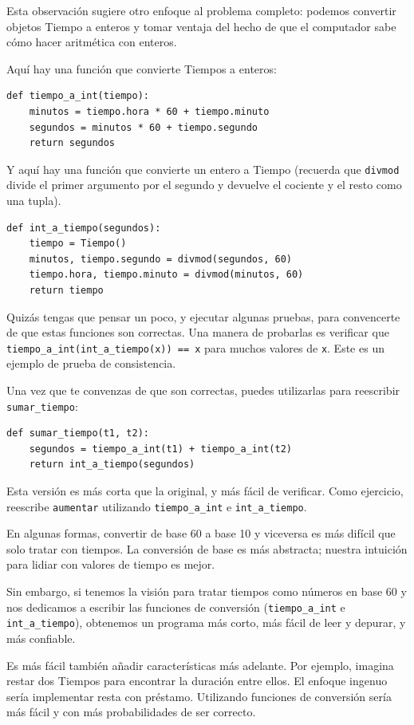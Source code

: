 \documentclass[10pt]{book}
\begin{document}
Esta observación sugiere otro enfoque al problema completo: podemos
convertir objetos Tiempo a enteros y tomar ventaja del hecho de
que el computador sabe cómo hacer aritmética con enteros.

Aquí hay una función que convierte Tiempos a enteros:

\begin{verbatim}
def tiempo_a_int(tiempo):
    minutos = tiempo.hora * 60 + tiempo.minuto
    segundos = minutos * 60 + tiempo.segundo
    return segundos
\end{verbatim}
%
Y aquí hay una función que convierte un entero a Tiempo
(recuerda que {\tt divmod} divide el primer argumento por el segundo
y devuelve el cociente y el resto como una tupla).

\begin{verbatim}
def int_a_tiempo(segundos):
    tiempo = Tiempo()
    minutos, tiempo.segundo = divmod(segundos, 60)
    tiempo.hora, tiempo.minuto = divmod(minutos, 60)
    return tiempo
\end{verbatim}
%
Quizás tengas que pensar un poco, y ejecutar algunas pruebas, para convencerte
de que estas funciones son correctas.  Una manera de probarlas es
verificar que \verb"tiempo_a_int(int_a_tiempo(x)) == x" para muchos valores de
{\tt x}.  Este es un ejemplo de prueba de consistencia.

Una vez que te convenzas de que son correctas, puedes utilizarlas para
reescribir \verb"sumar_tiempo":

\begin{verbatim}
def sumar_tiempo(t1, t2):
    segundos = tiempo_a_int(t1) + tiempo_a_int(t2)
    return int_a_tiempo(segundos)
\end{verbatim}
%
Esta versión es más corta que la original, y más fácil de verificar.  Como
ejercicio, reescribe {\tt aumentar} utilizando \verb"tiempo_a_int" e
\verb"int_a_tiempo".

En algunas formas, convertir de base 60 a base 10 y viceversa es más difícil
que solo tratar con tiempos.  La conversión de base es más abstracta; nuestra
intuición para lidiar con valores de tiempo es mejor.

Sin embargo, si tenemos la visión para tratar tiempos como números en base 60 y nos
dedicamos a escribir las funciones de conversión (\verb"tiempo_a_int"
e \verb"int_a_tiempo"), obtenemos un programa más corto, más fácil de
leer y depurar, y más confiable.

Es más fácil también añadir características más adelante.  Por ejemplo, imagina
restar dos Tiempos para encontrar la duración entre ellos.  El
enfoque ingenuo sería implementar resta con préstamo.
Utilizando funciones de conversión sería más fácil y con más probabilidades de ser
correcto.
\end{document}
